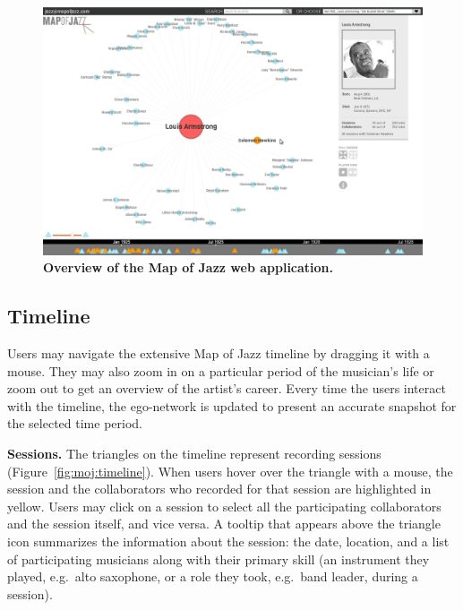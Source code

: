 \documentclass[12pt]{cmuthesis}
\begin{document}
  \begin{figure}[tb!]
    \centering
    \includegraphics[width=\linewidth]{figures/moj_overview.png}
    \caption{\textbf{Overview of the Map of Jazz web application.}}
    \label{fig:moj:overview}
  \end{figure}



  \subsection{Timeline}

  Users may navigate the extensive Map of Jazz timeline by dragging it with a
  mouse. They may also zoom in on a particular period of the musician's life or
  zoom out to get an overview of the artist's career. Every time the users
  interact with the timeline, the ego-network is updated to present an accurate
  snapshot for the selected time period.

  \textbf{Sessions.} The triangles on the timeline represent recording sessions (Figure~\ref{fig:moj:timeline}). When users hover over the triangle with a mouse, the session and the collaborators who recorded for that session are highlighted in yellow. Users may click on a session to select all the participating collaborators and the session itself, and vice versa. A tooltip that appears above the triangle icon summarizes the information about the session: the date, location, and a list of participating musicians along with their primary skill (an instrument they played, e.g.~alto saxophone, or a role they took, e.g.~band leader, during a session).
\end{document}
